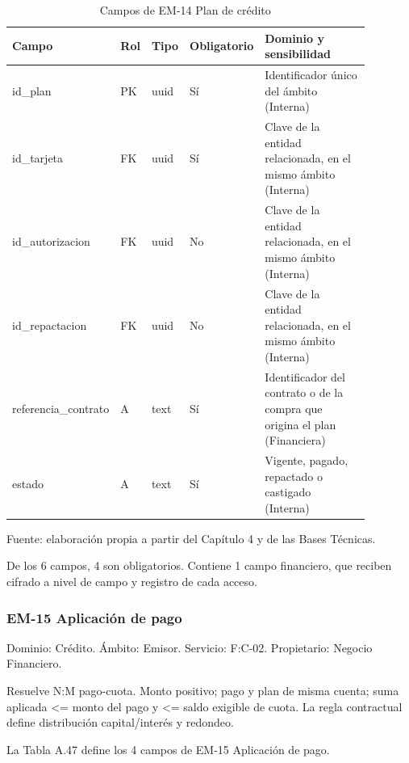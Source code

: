 \documentclass[11pt]{article}
\begin{document}
\begin{table}[htbp]
\caption{Campos de EM-14 Plan de crédito}\label{tab:d_em14}
\centering
\begin{tabular}{@{}p{0.167\linewidth}p{0.070\linewidth}p{0.079\linewidth}p{0.097\linewidth}p{0.465\linewidth}@{}}
\toprule Campo & Rol & Tipo & Obligatorio & Dominio y sensibilidad \\
\midrule
id\_plan & PK & uuid & Sí & Identificador único del ámbito (Interna) \\
id\_tarjeta & FK & uuid & Sí & Clave de la entidad relacionada, en el mismo ámbito (Interna) \\
id\_autorizacion & FK & uuid & No & Clave de la entidad relacionada, en el mismo ámbito (Interna) \\
id\_repactacion & FK & uuid & No & Clave de la entidad relacionada, en el mismo ámbito (Interna) \\
referencia\_contrato & A & text & Sí & Identificador del contrato o de la compra que origina el plan (Financiera) \\
estado & A & text & Sí & Vigente, pagado, repactado o castigado (Interna) \\
\bottomrule
\end{tabular}
\par\smallskip
{\raggedright Fuente: elaboración propia a partir del Capítulo 4 y de las Bases Técnicas.\par}
\end{table}


De los 6 campos, 4 son obligatorios. Contiene 1 campo financiero, que reciben cifrado a nivel de campo y registro de cada acceso.

\subsubsection{EM-15 Aplicación de pago}

Dominio: Crédito. Ámbito: Emisor. Servicio: F:C-02. Propietario: Negocio Financiero.

Resuelve N:M pago-cuota. Monto positivo; pago y plan de misma cuenta; suma aplicada <= monto del pago y <= saldo exigible de cuota. La regla contractual define distribución capital/interés y redondeo.

La Tabla A.47 define los 4 campos de EM-15 Aplicación de pago.
\end{document}
